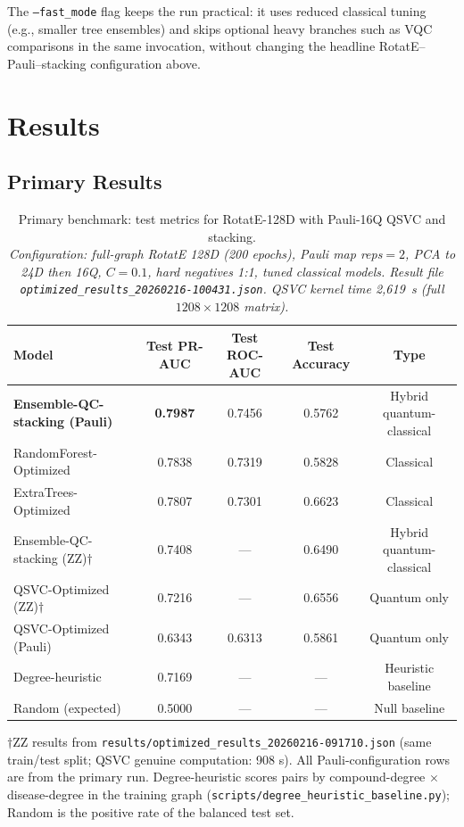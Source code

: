 \documentclass[twocolumn,10pt]{article}
\begin{document}
The \texttt{--fast\_mode} flag keeps the run practical: it uses reduced classical tuning (e.g., smaller tree ensembles) and skips optional heavy branches such as VQC comparisons in the same invocation, without changing the headline RotatE--Pauli--stacking configuration above.

\section{Results}

\subsection{Primary Results}

\begin{table}[t]
\centering
\caption{Primary benchmark: test metrics for RotatE-128D with Pauli-16Q QSVC and stacking.\protect\\
\small\textit{Configuration: full-graph RotatE 128D (200 epochs), Pauli map reps${=}2$, PCA to 24D then 16Q, $C{=}0.1$, hard negatives 1:1, tuned classical models. Result file \texttt{optimized\_results\_20260216-100431.json}. QSVC kernel time 2,619~s (full $1208{\times}1208$ matrix).}}
\label{tab:primary}
\begin{tabular}{@{}lcccc@{}}
\toprule
\textbf{Model} & \textbf{Test PR-AUC} & \textbf{Test ROC-AUC} & \textbf{Test Accuracy} & \textbf{Type} \\
\midrule
\textbf{Ensemble-QC-stacking (Pauli)} & \textbf{0.7987} & 0.7456 & 0.5762 & Hybrid quantum-classical \\
RandomForest-Optimized & 0.7838 & 0.7319 & 0.5828 & Classical \\
ExtraTrees-Optimized & 0.7807 & 0.7301 & 0.6623 & Classical \\
Ensemble-QC-stacking (ZZ)$\dagger$ & 0.7408 & --- & 0.6490 & Hybrid quantum-classical \\
QSVC-Optimized (ZZ)$\dagger$ & 0.7216 & --- & 0.6556 & Quantum only \\
QSVC-Optimized (Pauli) & 0.6343 & 0.6313 & 0.5861 & Quantum only \\
\midrule
Degree-heuristic & 0.7169 & --- & --- & Heuristic baseline \\
Random (expected) & 0.5000 & --- & --- & Null baseline \\
\bottomrule
\end{tabular}

\smallskip
\begin{minipage}{\linewidth}
\small $\dagger$ZZ results from \texttt{results/optimized\_results\_20260216-091710.json} (same train/test split; QSVC genuine computation: 908 s). All Pauli-configuration rows are from the primary run. Degree-heuristic scores pairs by compound-degree $\times$ disease-degree in the training graph (\texttt{scripts/degree\_heuristic\_baseline.py}); Random is the positive rate of the balanced test set.
\end{minipage}
\end{table}
\end{document}
